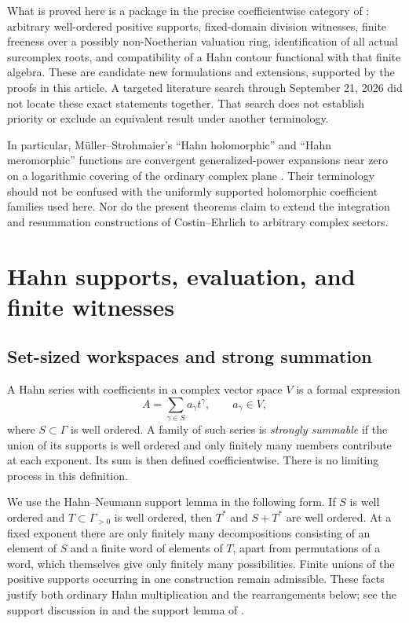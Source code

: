 \documentclass[11pt,letterpaper]{article}
\theoremstyle{definition}
\theoremstyle{remark}
\begin{document}
What is proved here is a package in the precise coefficientwise category of \cite{Supplied}: arbitrary well-ordered positive supports, fixed-domain division witnesses, finite freeness over a possibly non-Noetherian valuation ring, identification of all actual surcomplex roots, and compatibility of a Hahn contour functional with that finite algebra. These are candidate new formulations and extensions, supported by the proofs in this article. A targeted literature search through September 21, 2026 did not locate these exact statements together. That search does not establish priority or exclude an equivalent result under another terminology.

In particular, M\"uller--Strohmaier's ``Hahn holomorphic'' and ``Hahn meromorphic'' functions are convergent generalized-power expansions near zero on a logarithmic covering of the ordinary complex plane \cite{MullerStrohmaier}. Their terminology should not be confused with the uniformly supported holomorphic coefficient families used here. Nor do the present theorems claim to extend the integration and resummation constructions of Costin--Ehrlich \cite{CostinEhrlich} to arbitrary complex sectors.

\section{Hahn supports, evaluation, and finite witnesses}
\label{sec:support}

\subsection{Set-sized workspaces and strong summation}
A Hahn series with coefficients in a complex vector space $V$ is a formal expression
\[
 A=\sum_{\gamma\in S}a_\gamma t^\gamma,
 \qquad a_\gamma\in V,
\]
where $S\subset\Gamma$ is well ordered. A family of such series is \emph{strongly summable} if the union of its supports is well ordered and only finitely many members contribute at each exponent. Its sum is then defined coefficientwise. There is no limiting process in this definition.

We use the Hahn--Neumann support lemma in the following form. If $S$ is well ordered and $T\subset\Gamma_{>0}$ is well ordered, then $T^*$ and $S+T^*$ are well ordered. At a fixed exponent there are only finitely many decompositions consisting of an element of $S$ and a finite word of elements of $T$, apart from permutations of a word, which themselves give only finitely many possibilities. Finite unions of the positive supports occurring in one construction remain admissible. These facts justify both ordinary Hahn multiplication and the rearrangements below; see the support discussion in \cite{Poonen} and the support lemma of \cite{Supplied}.
\end{document}
